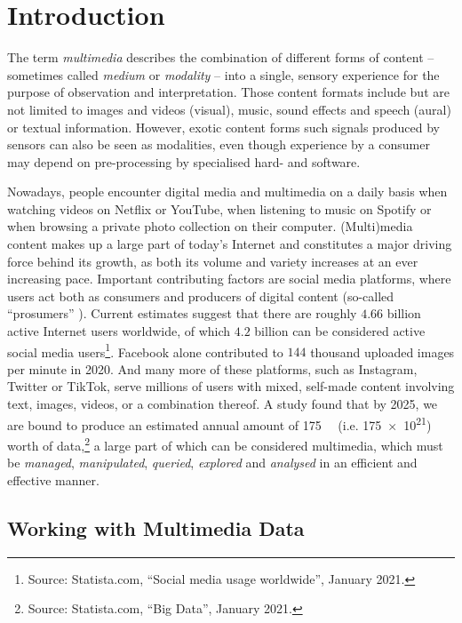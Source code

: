 \chapter{Introduction}
\label{chapter:introduction}

The term \emph{multimedia} describes the combination of different forms of content -- sometimes called \emph{medium} or \emph{modality} -- into a single, sensory experience for the purpose of observation and interpretation. Those content formats include but are not limited to images and videos (visual), music, sound effects and speech (aural) or textual information. However, exotic content forms such signals produced by sensors can also be seen as modalities, even though experience by a consumer may depend on pre-processing by specialised hard- and software.

Nowadays, people encounter digital media and multimedia on a daily basis when watching videos on Netflix or YouTube, when listening to music on Spotify or when browsing a private photo collection on their computer. (Multi)media content makes up a large part of today's Internet and constitutes a major driving force behind its growth, as both its volume and variety increases at an ever increasing pace. Important contributing factors are social media platforms, where users act both as consumers and producers of digital content (so-called ``prosumers'' \cite{Ritzer:2010Production,Ritzer2012:Coming}). Current estimates suggest that there are roughly $4.66$ billion active Internet users worldwide, of which $4.2$ billion can be considered active social media users\footnote{Source: Statista.com, ``Social media usage worldwide'', January 2021.}. Facebook alone contributed to $144$ thousand uploaded images per minute in 2020. And many more of these  platforms, such as Instagram, Twitter or TikTok, serve millions of users with mixed, self-made content involving text, images, videos, or a combination thereof. A study found that by 2025, we are bound to produce an estimated annual amount of \SI{175}{\zetta\byte} (i.e. \SI{175e21}{\byte}) worth of data,\footnote{Source: Statista.com, ``Big Data'', January 2021.} a large part of which can be considered multimedia, which must be \emph{managed}, \emph{manipulated}, \emph{queried}, \emph{explored} and \emph{analysed} in an efficient and effective manner.

\section{Working with Multimedia Data}

